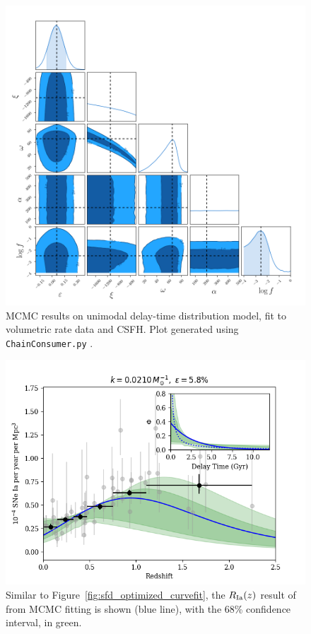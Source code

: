 \documentclass[apj]{aastex}
\begin{document}
\begin{figure}[t] %
   \centering
   \includegraphics[width=6.5in]{figure_sfd_corners} 
   \caption{\footnotesize MCMC results on unimodal delay-time distribution model, fit to volumetric rate data and CSFH. Plot generated using {\tt ChainConsumer.py} \citep{Hinton:2016qy}.}
   \label{fig:mcmc_sfd}
\end{figure}
\clearpage

\begin{figure}[t] %
   \centering
   \includegraphics[width=6.5in]{figure_fit_demo_werr} 
   \caption{\footnotesize Similar to Figure~\ref{fig:sfd_optimized_curvefit}, the $R_{\rm Ia}(z)$ result of from MCMC fitting is shown (blue line), with the 68\% confidence interval, in green. }
   \label{fig:figure_fit_demo_werr}
\end{figure}
\end{document}
